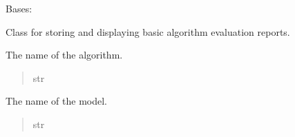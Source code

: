 \documentclass[letterpaper,10pt,english]{sphinxmanual}
\begin{document}
\begin{fulllineitems}
\label{\detokenize{domain.models:domain.models.BasicReport.BasicReport}}
\pysigstartsignatures
{}
\pysigstopsignatures
\sphinxAtStartPar
Bases: 

\sphinxAtStartPar
Class for storing and displaying basic algorithm evaluation reports.

\begin{fulllineitems}
\label{\detokenize{domain.models:domain.models.BasicReport.BasicReport.algorithm_name}}
\pysigstartsignatures
{}
\pysigstopsignatures
\sphinxAtStartPar
The name of the algorithm.
\begin{quote}\begin{description}
\sphinxAtStartPar
str

\end{description}\end{quote}

\end{fulllineitems}


\begin{fulllineitems}
\label{\detokenize{domain.models:domain.models.BasicReport.BasicReport.model}}
\pysigstartsignatures
{}
\pysigstopsignatures
\sphinxAtStartPar
The name of the model.
\begin{quote}\begin{description}
\sphinxAtStartPar
str

\end{description}\end{quote}


\end{fulllineitems}
\end{fulllineitems}
\end{document}

